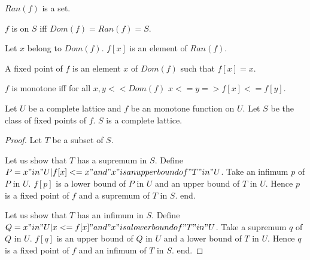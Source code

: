 \documentclass{document}
\begin{document}
\begin{forthel}
    \begin{signature}[RanSort]
      $Ran(f)$ is a set.
    \end{signature}

    \begin{definition}[DefDom]
      $f$ is on $S$ iff $Dom(f) = Ran(f) = S$.
    \end{definition}

    \begin{axiom}[ImgSort]
      Let $x$ belong to $Dom(f)$. $f[x]$ is an element of $Ran(f)$.
    \end{axiom}

    \begin{definition}[DefFix]
      A fixed point of $f$ is an element $x$ of $Dom(f)$ such that $f[x] = x$.
    \end{definition}

    \begin{definition}[DefMonot]
      $f$ is monotone iff for all $x,y << Dom(f)$ $x <= y => f[x] <= f[y]$.
    \end{definition}


    \begin{theorem}[Tarski]
      Let $U$ be a complete lattice and $f$ be an monotone function on $U$. Let $S$ be the class of fixed points of $f$. $S$ is a complete lattice.
    \end{theorem}
    \begin{proof}
      Let $T$ be a subset of $S$.

      Let us show that $T$ has a supremum in $S$.
        Define $P = {x "in" U | f[x] <= x "and" x "is an upper bound of" T "in" U}$. Take an infimum $p$ of $P$ in $U$. $f[p]$ is a lower bound of $P$ in $U$ and an upper bound of $T$ in $U$. Hence $p$ is a fixed point of $f$ and a supremum of $T$ in $S$.
      end.

      Let us show that $T$ has an infimum in $S$.
        Define $Q = {x "in" U | x <= f[x] "and" x "is a lower bound of" T "in" U}$. Take a supremum $q$ of $Q$ in $U$. $f[q]$ is an upper bound of $Q$ in $U$ and a lower bound of $T$ in $U$. Hence $q$ is a fixed point of $f$ and an infimum of $T$ in $S$.
      end.
    \end{proof}
  \end{forthel}
\end{document}
